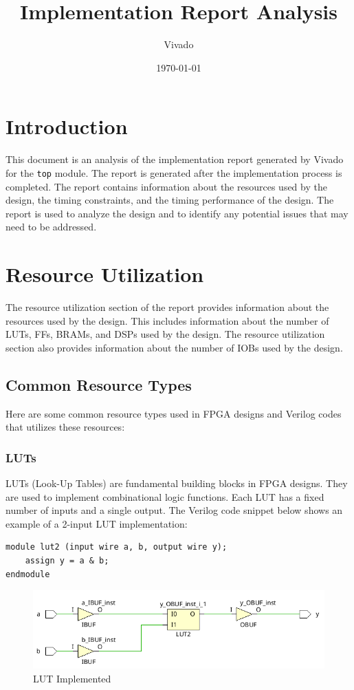 \documentclass{report}
\title{Implementation Report Analysis}
\author{Vivado}
\date{\today}
\begin{document}
\maketitle

\chapter{Introduction}

This document is an analysis of the implementation report generated by Vivado for the \texttt{top} module. The report is generated after the implementation process is completed. The report contains information about the resources used by the design, the timing constraints, and the timing performance of the design. The report is used to analyze the design and to identify any potential issues that may need to be addressed.

\chapter{Resource Utilization}

The resource utilization section of the report provides information about the resources used by the design. This includes information about the number of LUTs, FFs, BRAMs, and DSPs used by the design. The resource utilization section also provides information about the number of IOBs used by the design.

\section{Common Resource Types}
Here are some common resource types used in FPGA designs and Verilog codes that utilizes these resources:
\subsection{LUTs}
LUTs (Look-Up Tables) are fundamental building blocks in FPGA designs. They are used to implement combinational logic functions. Each LUT has a fixed number of inputs and a single output. The Verilog code snippet below shows an example of a 2-input LUT implementation:

\begin{verbatim}
module lut2 (input wire a, b, output wire y);
    assign y = a & b;
endmodule
\end{verbatim}

\begin{figure}[ht]
    \includegraphics[width=0.6\linewidth]{images/lut.png}
    \centering
    \caption{LUT Implemented}
    \label{fig:lut}
\end{figure}
\end{document}
